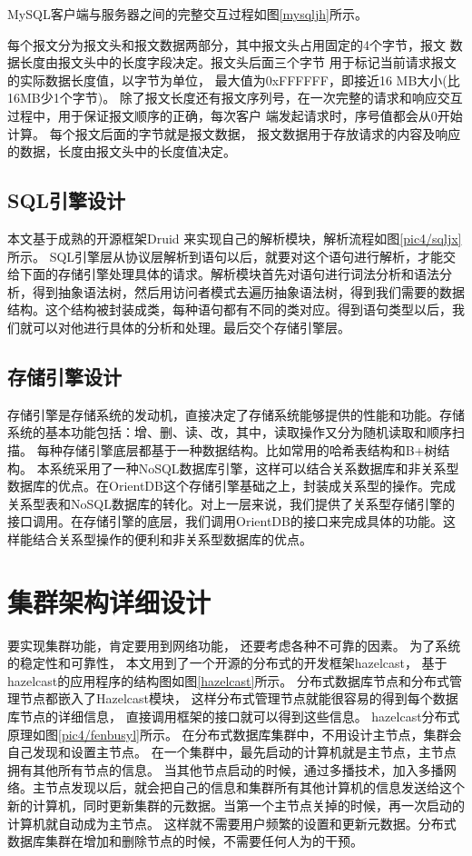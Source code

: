 MySQL客户端与服务器之间的完整交互过程如图\ref{mysqljh}所示。

每个报文分为报文头和报文数据两部分，其中报文头占用固定的4个字节，报文
数据长度由报文头中的长度字段决定。报文头后面三个字节
用于标记当前请求报文的实际数据长度值，以字节为单位，
最大值为0xFFFFFF，即接近16 MB大小(比16MB少1个字节)。
除了报文长度还有报文序列号，在一次完整的请求和响应交互过程中，用于保证报文顺序的正确，每次客户
端发起请求时，序号值都会从0开始计算。
每个报文后面的字节就是报文数据，
报文数据用于存放请求的内容及响应的数据，长度由报文头中的长度值决定。
\subsection{SQL引擎设计}
本文基于成熟的开源框架Druid
来实现自己的解析模块，解析流程如图\ref{pic4/sqljx}所示。
SQL引擎层从协议层解析到语句以后，就要对这个语句进行解析，才能交给下面的存储引擎处理具体的请求。解析模块首先对语句进行词法分析和语法分析，得到抽象语法树，然后用访问者模式去遍历抽象语法树，得到我们需要的数据结构。这个结构被封装成类，每种语句都有不同的类对应。得到语句类型以后，我们就可以对他进行具体的分析和处理。最后交个存储引擎层。
\subsection{存储引擎设计}
存储引擎是存储系统的发动机，直接决定了存储系统能够提供的性能和功能。存储
系统的基本功能包括：增、删、读、改，其中，读取操作又分为随机读取和顺序扫描。
每种存储引擎底层都基于一种数据结构。比如常用的哈希表结构和B+树结构。
本系统采用了一种NoSQL数据库引擎，这样可以结合关系数据库和非关系型数据库的优点。在OrientDB这个存储引擎基础之上，封装成关系型的操作。完成关系型表和NoSQL数据库的转化。对上一层来说，我们提供了关系型存储引擎的接口调用。在存储引擎的底层，我们调用OrientDB的接口来完成具体的功能。这样能结合关系型操作的便利和非关系型数据库的优点。
\section{集群架构详细设计}
要实现集群功能，肯定要用到网络功能，
还要考虑各种不可靠的因素。
为了系统的稳定性和可靠性，
本文用到了一个开源的分布式的开发框架hazelcast，
基于hazelcast的应用程序的结构图如图\ref{hazelcast}所示。
分布式数据库节点和分布式管理节点都嵌入了Hazelcast模块，
这样分布式管理节点就能很容易的得到每个数据库节点的详细信息，
直接调用框架的接口就可以得到这些信息。
hazelcast分布式原理如图\ref{pic4/fenbusyl}所示。
在分布式数据库集群中，不用设计主节点，集群会自己发现和设置主节点。
在一个集群中，最先启动的计算机就是主节点，主节点拥有其他所有节点的信息。
当其他节点启动的时候，通过多播技术，加入多播网络。主节点发现以后，就会把自己的信息和集群所有其他计算机的信息发送给这个新的计算机，同时更新集群的元数据。当第一个主节点关掉的时候，再一次启动的计算机就自动成为主节点。
这样就不需要用户频繁的设置和更新元数据。分布式数据库集群在增加和删除节点的时候，不需要任何人为的干预。
